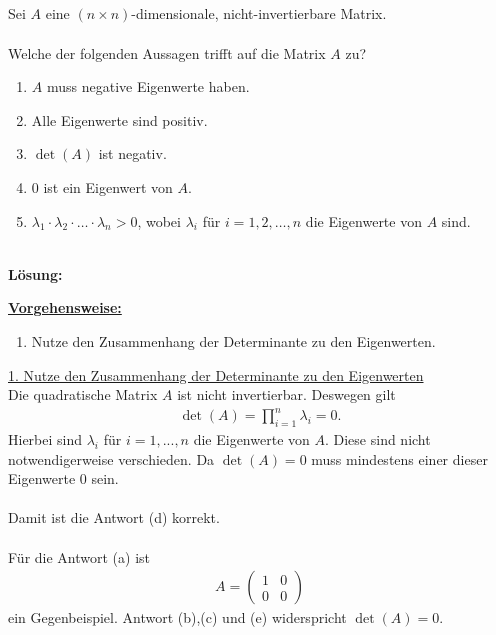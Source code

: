 \newpage
\subsection*{}
Sei $A$ eine $(n \times n)$-dimensionale, nicht-invertierbare Matrix.\\
\\
Welche der folgenden Aussagen trifft auf die Matrix $A$ zu?
\renewcommand{\labelenumi}{(\alph{enumi})}
\begin{enumerate}
	\item 
	$A$ muss negative Eigenwerte haben.
	\item
	Alle Eigenwerte sind positiv.
	\item
	$\det(A)$ ist negativ.
	\item
	$0$ ist ein Eigenwert von $A$.
	\item 
	$\lambda_1 \cdot \lambda_2 \cdot \dots \cdot \lambda_n > 0 $, wobei $\lambda_i$ für $i = 1,2,\dots,n$ die Eigenwerte von $A$ sind.
\end{enumerate}
\ \\
\textbf{Lösung:}
\begin{mdframed}
	\underline{\textbf{Vorgehensweise:}}
	\renewcommand{\labelenumi}{\theenumi.}
	\begin{enumerate}
		\item Nutze den Zusammenhang der Determinante zu den Eigenwerten.
	\end{enumerate}
\end{mdframed}

\underline{1. Nutze den Zusammenhang der Determinante zu den Eigenwerten}\\
Die quadratische Matrix $A$ ist nicht invertierbar. Deswegen gilt
\begin{align*}
	\det(A) = \prod \limits_{i=1}^n \lambda_i = 0.
\end{align*}
Hierbei sind $\lambda_i$ für $i = 1, ..., n$ die Eigenwerte von $A$. Diese sind nicht notwendigerweise verschieden.
Da $\det(A) = 0$ muss mindestens einer dieser Eigenwerte $0$ sein. \\
\\
Damit ist die Antwort (d) korrekt.\\
\\
Für die Antwort (a) ist
\begin{align*}
	A = 
	\begin{pmatrix}
		1 & 0\\
		0 & 0
	\end{pmatrix}
\end{align*}
ein Gegenbeispiel. Antwort (b),(c) und (e) widerspricht $\det(A) = 0$.
 